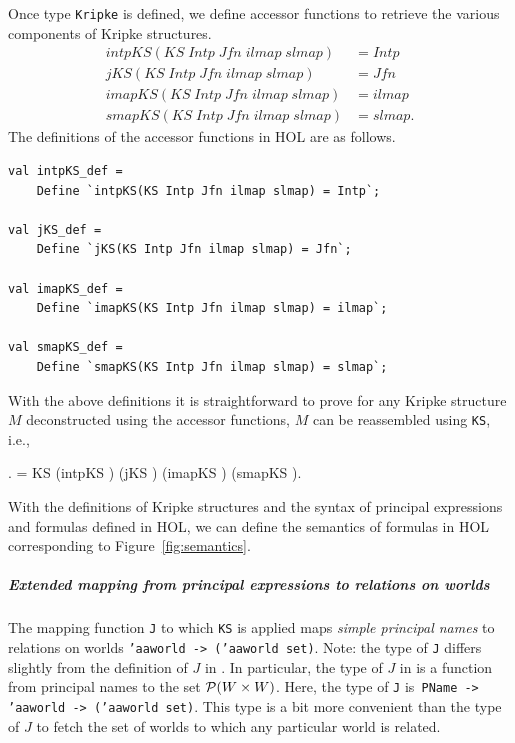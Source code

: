 Once type \texttt{Kripke} is defined, we define accessor functions to retrieve the various components of Kripke structures.
\begin{align*}
  intpKS(KS\; \mathit{Intp}\; \mathit{Jfn}\; ilmap\; slmap) &= \mathit{Intp}\\
  jKS(KS\; \mathit{Intp}\; \mathit{Jfn}\; ilmap\; slmap) &=
  \mathit{Jfn}\\
  imapKS(KS\; \mathit{Intp}\; \mathit{Jfn}\; ilmap\; slmap) &= ilmap\\
  smapKS(KS\; \mathit{Intp}\; \mathit{Jfn}\; ilmap\; slmap) &= slmap.
\end{align*}
The definitions of the accessor functions in HOL are as follows.
\begin{session}
\begin{verbatim}
val intpKS_def =
    Define `intpKS(KS Intp Jfn ilmap slmap) = Intp`;

val jKS_def =
    Define `jKS(KS Intp Jfn ilmap slmap) = Jfn`;

val imapKS_def =
    Define `imapKS(KS Intp Jfn ilmap slmap) = ilmap`;

val smapKS_def =
    Define `smapKS(KS Intp Jfn ilmap slmap) = slmap`;
\end{verbatim}
\end{session}

With the above definitions it is straightforward to prove for any
Kripke structure $M$ deconstructed using the accessor functions, $M$
can be reassembled using \texttt{KS}, i.e.,
\begin{center}
\HOLTokenTurnstile{} \HOLTokenForall{}. 
= KS (intpKS ) (jKS ) (imapKS
) (smapKS ).
\end{center}

With the definitions of Kripke structures and the syntax of principal
expressions and formulas defined in HOL, we can define the semantics
of formulas in HOL corresponding to Figure~\ref{fig:semantics}.

\subparagraph{Extended mapping from principal expressions to relations
  on worlds}

The mapping function \texttt{J} to which \texttt{KS} is applied maps
\emph{simple principal names} to relations on worlds \texttt{'aaworld
  -> ('aaworld set)}. Note: the type of \texttt{J} differs slightly
from the definition of $J$ in \cite{ACST}. In particular, the type of
$J$ in \cite{ACST} is a function from principal names to the set
$\mathcal{P}(W \times W)$. Here, the type of \texttt{J} is\texttt{ PName
  -> 'aaworld -> ('aaworld set)}.  This type is a bit more convenient
than the type of $J$ to fetch the set of worlds to which any
particular world is related.

